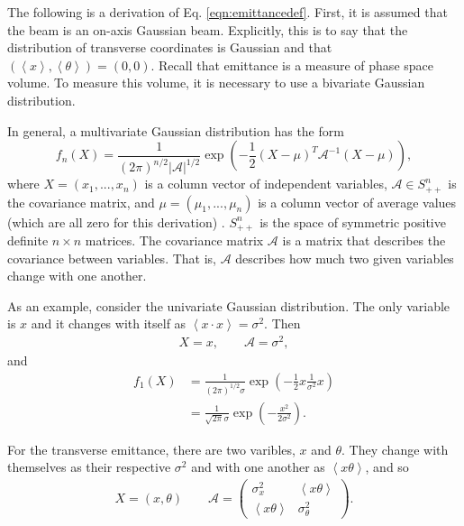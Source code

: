  \label{apx:emittance}

The following is a derivation of Eq. \eqref{eqn:emittancedef}. First, it is assumed that the beam is an on-axis Gaussian beam. Explicitly, this is to say that the distribution of transverse coordinates is Gaussian and that $\left(\left<x\right>,\left<\theta\right>\right)=(0,0)$. Recall that emittance is a measure of phase space volume. To measure this volume, it is necessary to use a bivariate Gaussian distribution.

In general, a multivariate Gaussian distribution has the form
\begin{equation}\nonumber
f_n (X)=\frac{1}{(2\pi)^{n/2}|\mathcal{A}|^{1/2}}\exp\left(-\frac{1}{2}(X-\mu)^T\mathcal{A}^{-1}(X-\mu)\right),
\end{equation}
where $X=(x_1,...,x_n)$ is a column vector of independent variables, $\mathcal{A}\in S^n_{++}$ is the covariance matrix, and $\mu=(\mu_1,...,\mu_n)$ is a column vector of average values (which are all zero for this derivation) \cite{Do}. $S^n_{++}$ is the space of symmetric positive definite $n\times n$ matrices.  The covariance matrix $\mathcal{A}$ is a matrix that describes the covariance between variables. That is, $\mathcal{A}$ describes how much two given variables change with one another.

As an example, consider the univariate Gaussian distribution. The only variable is $x$ and it changes with itself as $\left<x\cdot x\right> = \sigma^2$. Then
\begin{align*}
X=x,\qquad\mathcal{A}=\sigma^2,
\end{align*}
and
\begin{align*}
f_1 (X)&=\frac{1}{(2\pi)^{1/2}\sigma} \exp\left(-\frac{1}{2}x\frac{1}{\sigma^2}x\right)\\
&=\frac{1}{\sqrt{2\pi}\sigma} \exp\left(-\frac{x^2}{2\sigma^2}\right).
\end{align*}

For the transverse emittance, there are two varibles, $x$ and $\theta$. They change with themselves as their respective $\sigma^2$ and with one another as $\left<x\theta\right>$, and so
\begin{align*}
X=(x,\theta)\qquad\mathcal{A}=\begin{pmatrix}
					\sigma_x^2 & \left<x\theta\right>\\
					\left<x\theta\right> & \sigma_\theta^2
					\end{pmatrix}.
\end{align*}

